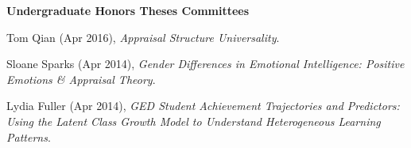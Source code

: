 {\large \textbf{Undergraduate Honors Theses Committees}}
\begin{etaremune}\item Tom Qian (Apr 2016), \textit{Appraisal Structure Universality}.%
%
\item Sloane Sparks (Apr 2014), \textit{Gender Differences in Emotional Intelligence: Positive Emotions \& Appraisal Theory}.%
\item Lydia Fuller (Apr 2014), \textit{GED Student Achievement Trajectories and Predictors: Using the Latent Class Growth Model to Understand Heterogeneous Learning Patterns}.%
\end{etaremune}
